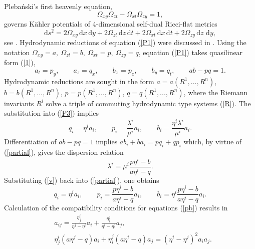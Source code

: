 \documentclass[12pt, a4paper]{article}
\theoremstyle{definition}
\renewcommand{\d}{\mathrm{d}}
\begin{document}
Pleba\'nski's first heavenly equation,
\begin{equation}
\Omega_{xy}\Omega_{zt}-\Omega_{xt}\Omega_{zy}=1,
\label{P1}
\end{equation}
governs K\"ahler potentials of  4-dimensional self-dual Ricci-flat metrics
\begin{equation*}
\d s^2 = 2\Omega_{xy} \,\d x \, \d y + 2\Omega_{zt} \, \d z \,\d t + 2\Omega_{xt} \, \d x \, \d t + 2 \Omega_{zy} \, \d z \, \,\d y,
\label{metric0}
\end{equation*}
see \cite{plebanski1975solutions}. Hydrodynamic reductions of equation (\ref{P1}) were discussed in \cite{ferapontov2003hydrodynamic}.
Using the notation $\Omega_{xy}=a, \ \Omega_{zt}=b, \ \Omega_{xt}=p, \ \Omega_{zy}=q$,
equation (\ref{P1}) takes quasilinear form (\ref{1}),
\begin{equation}
a_t=p_y, \qquad a_z=q_x, \qquad b_x=p_z, \qquad b_y=q_t, \qquad ab-pq=1.
\label{P3}
\end{equation}
Hydrodynamic reductions are sought in the form
$a=a(R^1, ..., R^n)$, $b=b(R^1, ..., R^n)$, $ p=p(R^1, ..., R^n)$, $q=q(R^1, ..., R^n)$, 
where the Riemann invariants  $R^i$ solve a triple of commuting hydrodynamic type systems  (\ref{R}).
The substitution  into (\ref{P3}) implies
\begin{equation}
q_i=\eta^ia_i, \qquad p_i=\frac{\lambda^i}{\mu^i}a_i, \qquad 
b_i=\frac{\eta^i \lambda^i}{\mu^i}a_i.
\label{partial}
\end{equation}
Differentiation of $ab-pq=1$ implies $ab_i+ba_i=pq_i+qp_i$ which, by virtue of (\ref{partial}), gives the dispersion relation
\begin{equation}
\lambda^i=\mu^i\frac{p\eta^i-b}{a\eta^i-q}.
\label{v}
\end{equation}
Substituting (\ref{v}) back into (\ref{partial}), one obtains
\begin{equation}
q_i=\eta^ia_i, \qquad 
p_i=\frac{p\eta^i-b}{a\eta^i-q}a_i, \qquad 
b_i=\eta^i \frac{p\eta^i-b}{a\eta^i-q}a_i.
\label{pb}
\end{equation}
Calculation of the compatibility conditions for equations (\ref{pb}) results in
\begin{equation}
\begin{split}
& a_{ij}=\frac{\eta^i_j}{\eta^j-\eta^i}a_i+\frac{\eta^j_i}{\eta^i-\eta^j}a_j, \\
& \eta^i_j(a\eta^j-q)a_i+\eta^j_i(a\eta^i-q)a_j=
(\eta^i-\eta^j)^2a_ia_j.
\end{split}
\label{a}
\end{equation}
\end{document}
